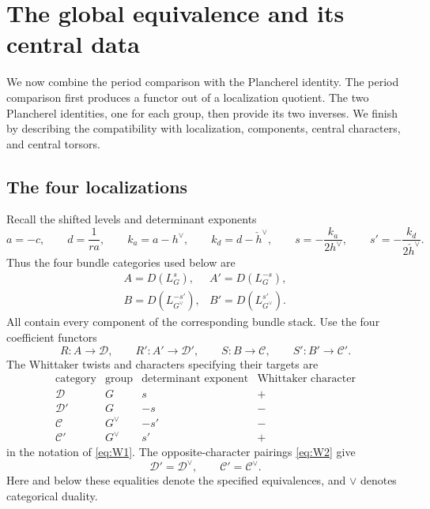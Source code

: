 \section{The global equivalence and its central data}
\label{sec:equivalence}

We now combine the period comparison with the Plancherel identity.  The
period comparison first produces a functor out of a localization quotient.
The two Plancherel identities, one for each group, then provide its two
inverses.  We finish by describing the compatibility with localization,
components, central characters, and central torsors.

\subsection{The four localizations}

Recall the shifted levels and determinant exponents
\[
 a=-c,\qquad d=\frac1{ra},\qquad
 k_a=a-h^\vee,\qquad k_d=d-\check h^\vee,\qquad
 s=-\frac{k_a}{2h^\vee},\qquad
 s'=-\frac{k_d}{2\check h^\vee}.
\]
Thus the four bundle categories used below are
\[
 \begin{array}{ll}
 A=D(L_G^s),& A'=D(L_G^{-s}),\\
 B=D(L_{G^\vee}^{-s'}),&B'=D(L_{G^\vee}^{s'}).
 \end{array}
\]
All contain every component of the corresponding bundle stack.  Use the
four coefficient functors
\[
 R:A\longrightarrow\mathcal D,\qquad
 R':A'\longrightarrow\mathcal D',\qquad
 S:B\longrightarrow\mathcal C,\qquad
 S':B'\longrightarrow\mathcal C'.
\]
The Whittaker twists and characters specifying their targets are
\[
 \begin{array}{c|c|c|c}
 \text{category}&\text{group}&\text{determinant exponent}&
       \text{Whittaker character}\\ \hline
 \mathcal D&G&s&+\\
 \mathcal D'&G&-s&-\\
 \mathcal C&G^\vee&-s'&-\\
 \mathcal C'&G^\vee&s'&+
 \end{array}
\]
in the notation of \eqref{eq:W1}.  The opposite-character pairings
\eqref{eq:W2} give
\[
 \mathcal D'=\mathcal D^\vee,\qquad
 \mathcal C'=\mathcal C^\vee.
\]
Here and below these equalities denote the specified equivalences, and
\(\vee\) denotes categorical duality.

